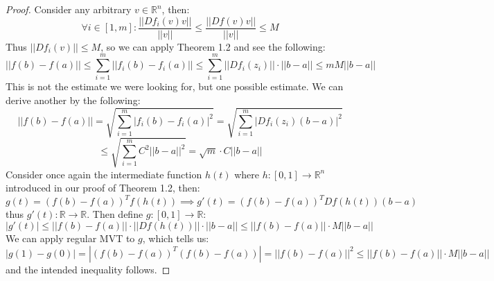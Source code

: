 \documentclass[10pt,letterpaper]{article} %
\begin{document}
\begin{proof}
Consider any arbitrary $v \in \mathbb{R}^n$, then:
\begin{equation*}
\forall i \in [1, m]: \frac{||Df_i(v)v||}{||v||} \leqslant \frac{||Df(v)v||}{||v||} \leqslant M
\end{equation*}
Thus $||Df_i(v)|| \leqslant M$, so we can apply Theorem 1.2 and see the following:
\begin{equation*}
||f(b) - f(a)|| \leqslant \sum_{i=1}^{m}||f_i(b) - f_i(a)|| \leqslant \sum_{i=1}^{m}||Df_i(z_i)||\cdot||b-a|| \leqslant mM||b-a||
\end{equation*}
This is not the estimate we were looking for, but one possible estimate. We can derive another by the following:
\begin{equation*}
||f(b) - f(a)|| = \sqrt{\sum_{i=1}^{m}|f_i(b) - f_i(a)|^2} = \sqrt{\sum_{i=1}^{m}|Df_i(z_i)(b-a)|^2}
\end{equation*}
\begin{equation*}
\leqslant \sqrt{\sum_{i=1}^{m}C^2||b-a||^2} = \sqrt{m}\cdot C||b-a||
\end{equation*}
Consider once again the intermediate function $h(t)$ where $h: [0, 1] \xrightarrow{} \mathbb{R}^n$ introduced in our proof of Theorem 1.2, then:
\begin{equation*}
g(t) = (f(b) - f(a))^Tf(h(t)) \implies g'(t) = (f(b) - f(a))^TDf(h(t))(b-a)
\end{equation*}
thus $g'(t): \mathbb{R} \xrightarrow{} \mathbb{R}$. Then define $g: [0, 1] \xrightarrow{} \mathbb{R}$:
\begin{equation*}
|g'(t)| \leqslant ||f(b) - f(a)|| \cdot ||Df(h(t))|| \cdot ||b-a|| \leqslant ||f(b) - f(a)|| \cdot M||b-a||
\end{equation*}
We can apply regular MVT to $g$, which tells us:
\begin{equation*}
|g(1) - g(0)| = |(f(b) - f(a))^T(f(b) - f(a))| = ||f(b) - f(a)||^2 \leqslant ||f(b) - f(a)|| \cdot M||b-a||
\end{equation*}
and the intended inequality follows.
\end{proof}
\end{document}
